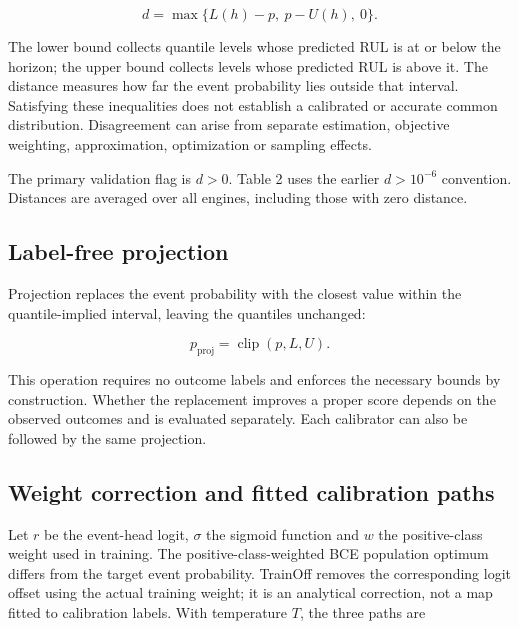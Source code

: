 \documentclass[IJPHM, 2026, 0]{phmsociety}
\begin{document}
\begin{equation}
d=\max\{L(h)-p,\ p-U(h),\ 0\}.
\end{equation}

The lower bound collects quantile levels whose predicted RUL is at or below the horizon; the upper bound collects levels whose predicted RUL is above it. The distance measures how far the event probability lies outside that interval. Satisfying these inequalities does not establish a calibrated or accurate common distribution. Disagreement can arise from separate estimation, objective weighting, approximation, optimization or sampling effects.

The primary validation flag is \(d>0\). Table \mbox{2} uses the earlier \(d>10^{-6}\) convention. Distances are averaged over all engines, including those with zero distance.

\subsection{Label-free projection}\label{label-free-projection}

Projection replaces the event probability with the closest value within the quantile-implied interval, leaving the quantiles unchanged:

\begin{equation}
p_{\mathrm{proj}}=\operatorname{clip}(p,L,U).
\end{equation}

This operation requires no outcome labels and enforces the necessary bounds by construction. Whether the replacement improves a proper score depends on the observed outcomes and is evaluated separately. Each calibrator can also be followed by the same projection.

\subsection{Weight correction and fitted calibration paths}\label{weight-correction-and-fitted-calibration-paths}

Let \(r\) be the event-head logit, \(\sigma\) the sigmoid function and \(w\) the positive-class weight used in training. The positive-class-weighted BCE population optimum differs from the target event probability. TrainOff removes the corresponding logit offset using the actual training weight; it is an analytical correction, not a map fitted to calibration labels. With temperature \(T\), the three paths are
\end{document}
